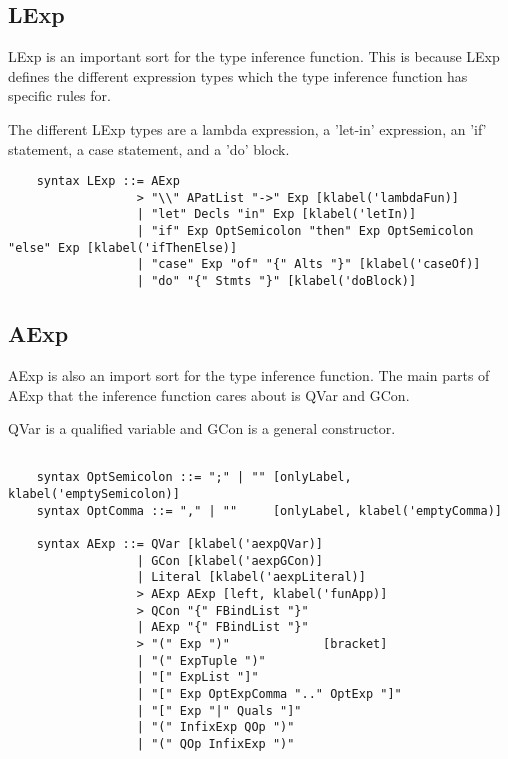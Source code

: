 \subsection{LExp}
LExp is an important sort for the type inference function. This is because LExp defines the different expression types which the type inference function has specific rules for.

The different LExp types are a lambda expression, a 'let-in' expression, an 'if' statement, a case statement, and a 'do' block.

\begin{lstlisting}
    syntax LExp ::= AExp
                  > "\\" APatList "->" Exp [klabel('lambdaFun)]
                  | "let" Decls "in" Exp [klabel('letIn)]
                  | "if" Exp OptSemicolon "then" Exp OptSemicolon "else" Exp [klabel('ifThenElse)]
                  | "case" Exp "of" "{" Alts "}" [klabel('caseOf)]
                  | "do" "{" Stmts "}" [klabel('doBlock)]

\end{lstlisting}

\subsection{AExp}
AExp is also an import sort for the type inference function. The main parts of AExp that the inference function cares about is QVar and GCon.

QVar is a qualified variable and GCon is a general constructor.

\begin{lstlisting}

    syntax OptSemicolon ::= ";" | "" [onlyLabel, klabel('emptySemicolon)]
    syntax OptComma ::= "," | ""     [onlyLabel, klabel('emptyComma)]

    syntax AExp ::= QVar [klabel('aexpQVar)]
                  | GCon [klabel('aexpGCon)]
                  | Literal [klabel('aexpLiteral)]
                  > AExp AExp [left, klabel('funApp)]
                  > QCon "{" FBindList "}"
                  | AExp "{" FBindList "}"
                  > "(" Exp ")"             [bracket]
                  | "(" ExpTuple ")"
                  | "[" ExpList "]"
                  | "[" Exp OptExpComma ".." OptExp "]"
                  | "[" Exp "|" Quals "]"
                  | "(" InfixExp QOp ")"
                  | "(" QOp InfixExp ")"
                           
\end{lstlisting}
